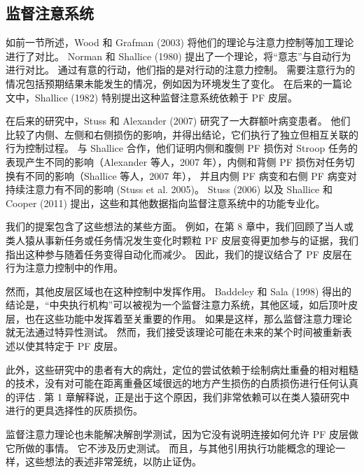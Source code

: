 \subsection{监督注意系统}
如前一节所述，Wood 和 Grafman (2003) 将他们的理论与注意力控制等加工理论进行了对比。 Norman 和 Shallice (1980) 提出了一个理论，将“意志”与自动行为进行对比。 通过有意的行动，他们指的是对行动的注意力控制。 需要注意行为的情况包括预期结果未能发生的情况，例如因为环境发生了变化。 在后来的一篇论文中，Shallice (1982) 特别提出这种监督注意系统依赖于 PF 皮层。
\par 
在后来的研究中，Stuss 和 Alexander (2007) 研究了一大群额叶病变患者。 他们比较了内侧、左侧和右侧损伤的影响，并得出结论，它们执行了独立但相互关联的行为控制过程。 与 Shallice 合作，他们证明内侧和腹侧 PF 损伤对 Stroop 任务的表现产生不同的影响（Alexander 等人，2007 年），内侧和背侧 PF 损伤对任务切换有不同的影响（Shallice 等人，2007 年）， 并且内侧 PF 病变和右侧 PF 病变对持续注意力有不同的影响 (Stuss et al. 2005)。 Stuss (2006) 以及 Shallice 和 Cooper (2011) 提出，这些和其他数据指向监督注意系统中的功能专业化。
\par 
我们的提案包含了这些想法的某些方面。 例如，在第 8 章中，我们回顾了当人或类人猿从事新任务或任务情况发生变化时颗粒 PF 皮层变得更加参与的证据，我们指出这种参与随着任务变得自动化而减少。 因此，我们的提议结合了 PF 皮层在行为注意力控制中的作用。
\par 
然而，其他皮层区域也在这种控制中发挥作用。 Baddeley 和 Sala (1998) 得出的结论是，“中央执行机构”可以被视为一个监督注意力系统，其他区域，如后顶叶皮层，也在这些功能中发挥着至关重要的作用。 如果是这样，那么监督注意力理论就无法通过特异性测试。 然而，我们接受该理论可能在未来的某个时间被重新表述以使其特定于 PF 皮层。
\par 
此外，这些研究中的患者有大的病灶，定位的尝试依赖于绘制病灶重叠的相对粗糙的技术，没有对可能在距离重叠区域很远的地方产生损伤的白质损伤进行任何认真的评估 . 第 1 章解释说，正是出于这个原因，我们非常依赖可以在类人猿研究中进行的更具选择性的灰质损伤。
\par 
监督注意力理论也未能解决解剖学测试，因为它没有说明连接如何允许 PF 皮层做它所做的事情。 它不涉及历史测试。 而且，与其他引用执行功能概念的理论一样，这些想法的表述非常笼统，以防止证伪。
